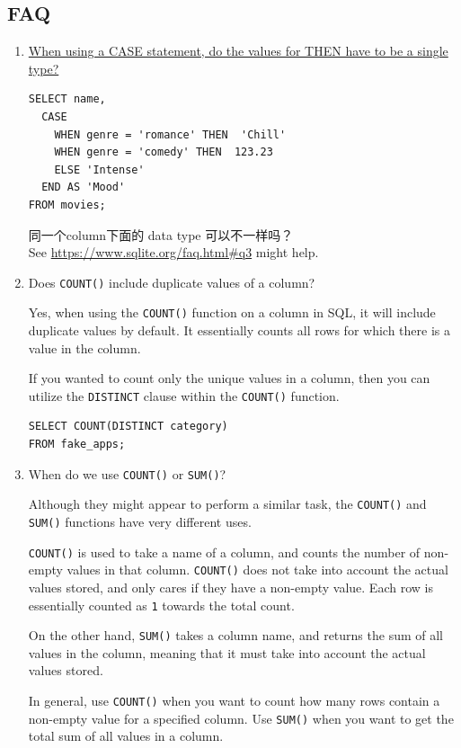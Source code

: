 \documentclass[a4paper, 12pt]{article}
\begin{document}
\subsection{FAQ}
\begin{enumerate}
\item \href{https://discuss.codecademy.com/t/when-using-a-case-statement-do-the-values-for-then-have-to-be-a-single-type/351538}{When using a CASE statement, do the values for THEN have to be a single type?}
\begin{verbatim}
SELECT name,
  CASE
    WHEN genre = 'romance' THEN  'Chill'
    WHEN genre = 'comedy' THEN  123.23
    ELSE 'Intense'
  END AS 'Mood'
FROM movies;
\end{verbatim}
同一个column下面的 data type 可以不一样吗？\\
See \url{https://www.sqlite.org/faq.html#q3} might help.

\item Does \verb|COUNT()| include duplicate values of a column?

Yes, when using the \verb|COUNT()| function on a column in SQL, it will include duplicate values by default. It essentially counts all rows for which there is a value in the column.

If you wanted to count only the unique values in a column, then you can utilize the \verb|DISTINCT| clause within the \verb|COUNT()| function.
\begin{verbatim}
SELECT COUNT(DISTINCT category)
FROM fake_apps;
\end{verbatim}

\item When do we use \verb|COUNT()| or \verb|SUM()|?

Although they might appear to perform a similar task, the \verb|COUNT()| and \verb|SUM()| functions have very different uses.

\verb|COUNT()| is used to take a name of a column, and counts the number of non-empty values in that column. \verb|COUNT()| does not take into account the actual values stored, and only cares if they have a non-empty value. Each row is essentially counted as \verb|1| towards the total count.

On the other hand, \verb|SUM()| takes a column name, and returns the sum of all values in the column, meaning that it must take into account the actual values stored.

In general, use \verb|COUNT()| when you want to count how many rows contain a non-empty value for a specified column. Use \verb|SUM()| when you want to get the total sum of all values in a column.


\end{enumerate}
\end{document}
